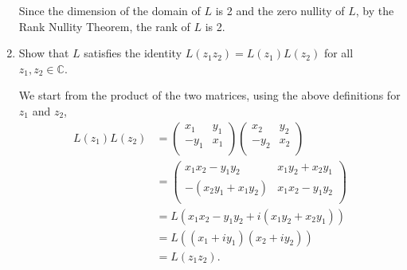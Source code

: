 \documentclass{article}
\begin{document}
\begin{enumerate}[label=(\alph*)]
    Since the dimension of the domain of $L$ is 2 and the zero nullity of $L$, by the Rank Nullity Theorem, the rank of $L$ is 2.

  \item Show that $L$ satisfies the identity $L(z_1 z_2)=L(z_1)L(z_2)$ for all $z_1,z_2 \in \mathbb{C}$.

  We start from the product of the two matrices, using the above definitions for $z_1$ and $z_2$,
  \begin{align*}
    L(z_1)L(z_2)&= \begin{pmatrix} 
      x_1 & y_1 \\ -y_1 & x_1 \\
    \end{pmatrix} \begin{pmatrix} 
      x_2 & y_2 \\ -y_2 & x_2 \\
    \end{pmatrix} \\
    &= \begin{pmatrix} 
      x_1x_2-y_1y_2 & x_1y_2 + x_2y_1 \\ -(x_2y_1+x_1y_2) & x_1x_2-y_1y_2 \\
    \end{pmatrix}  \\
    &= L\left(x_1x_2-y_1y_2+i(x_1y_2+x_2y_1)\right) \\
    &= L\left((x_1+iy_1)(x_2+iy_2)\right) \\
    &= L(z_1z_2). \\
  \end{align*}

\end{enumerate}  
\end{document}

